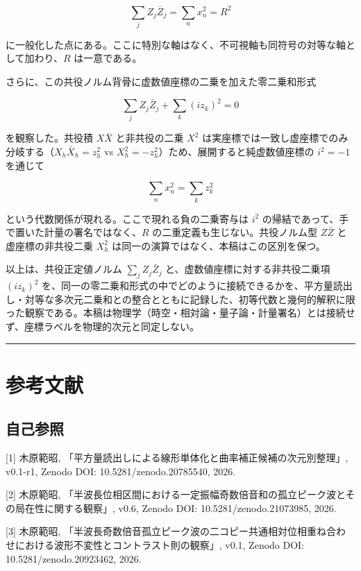 \documentclass[11pt,a4paper]{ltjsarticle}
\begin{document}
\[
\sum_j Z_j\bar Z_j=\sum_n x_n^2=R^2
\]

に一般化した点にある。ここに特別な軸はなく、不可視軸も同符号の対等な軸として加わり、\(R\)
は一意である。

さらに、この共役ノルム背骨に虚数値座標の二乗を加えた零二乗和形式

\[
\sum_j Z_j\bar Z_j+\sum_k (i z_k)^2=0
\]

を観察した。共役積 \(X\bar X\) と非共役の二乗 \(X^2\)
は実座標では一致し虚座標でのみ分岐する（\(X_h\bar X_h=z_h^2\) vs
\(X_h^2=-z_h^2\)）ため、展開すると純虚数値座標の \(i^2=-1\) を通じて

\[
\sum_{n} x_n^2=\sum_{k} z_k^2
\]

という代数関係が現れる。ここで現れる負の二乗寄与は \(i^2\)
の帰結であって、手で置いた計量の署名ではなく、\(R\)
の二重定義も生じない。共役ノルム型 \(Z\bar Z\) と虚座標の非共役二乗
\(X_h^2\) は同一の演算ではなく、本稿はこの区別を保つ。

以上は、共役正定値ノルム \(\sum_j Z_j\bar Z_j\)
と、虚数値座標に対する非共役二乗項 \((i z_k)^2\)
を、同一の零二乗和形式の中でどのように接続できるかを、平方量読出し・対等な多次元二乗和との整合とともに記録した、初等代数と幾何的解釈に限った観察である。本稿は物理学（時空・相対論・量子論・計量署名）とは接続せず、座標ラベルを物理的次元と同定しない。

\begin{center}\rule{0.5\linewidth}{0.5pt}\end{center}

\section{参考文献}\label{ux53c2ux8003ux6587ux732e}

\subsection{自己参照}\label{ux81eaux5df1ux53c2ux7167}

{[}1{]} 木原範昭,
「平方量読出しによる線形単体化と曲率補正候補の次元別整理」, v0.1-r1,
Zenodo DOI: 10.5281/zenodo.20785540, 2026.

{[}2{]} 木原範昭,
「半波長位相区間における一定振幅奇数倍音和の孤立ピーク波とその局在性に関する観察」,
v0.6, Zenodo DOI: 10.5281/zenodo.21073985, 2026.

{[}3{]} 木原範昭,
「半波長奇数倍音孤立ピーク波の二コピー共通相対位相重ね合わせにおける波形不変性とコントラスト則の観察」,
v0.1, Zenodo DOI: 10.5281/zenodo.20923462, 2026.
\end{document}
